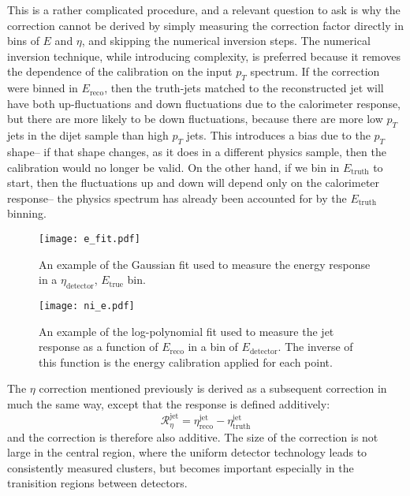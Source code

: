 This is a rather complicated procedure, and a relevant question to ask is why the correction cannot be derived by simply measuring the correction factor directly in bins of $E$ and $\eta$, and skipping the numerical inversion steps. The numerical inversion technique, while introducing complexity, is preferred because it removes the dependence of the calibration on the input $p_T$ spectrum. If the correction were binned in $E_{\mathrm{reco}}$, then the truth-jets matched to the reconstructed jet will have both up-fluctuations and down fluctuations due to the calorimeter response, but there are more likely to be down fluctuations, because there are more low $p_T$ jets in the dijet sample than high $p_T$ jets. This introduces a bias due to the $p_T$ shape-- if that shape changes, as it does in a different physics sample, then the calibration would no longer be valid. On the other hand, if we bin in $E_{\mathrm{truth}}$ to start, then the fluctuations up and down will depend only on the calorimeter response-- the physics spectrum has already been accounted for by the $E_{\mathrm{truth}}$ binning.



\begin{figure}
\centering
\texttt{[image: e\_fit.pdf]}
\label{fig:jet-reconstruction:e-fit}
\caption{An example of the Gaussian fit used to measure the energy response in a $\eta_\mathrm{detector}$, $E_\mathrm{true}$ bin.}
\end{figure}




\begin{figure}
\centering
\texttt{[image: ni\_e.pdf]}
\label{fig:jet-reconstruction:e-fit}
\caption{An example of the log-polynomial fit used to measure the jet response as a function of $E_\mathrm{reco}$ in a bin of $E_\mathrm{detector}$. The inverse of this function is the energy calibration applied for each point.}
\end{figure}




The $\eta$ correction mentioned previously is derived as a subsequent correction in much the same way, except that the response is defined additively:
%
\begin{equation}
\mathcal{R}_\eta^\mathrm{jet} = \eta^{\mathrm{jet}}_{\mathrm{reco}} -  \eta^{\mathrm{jet}}_{\mathrm{truth}} 
\end{equation}
%
and the correction is therefore also additive. The size of the correction is not large in the central region, where the uniform detector technology leads to consistently measured clusters, but becomes important especially in the tranisition regions between detectors.

